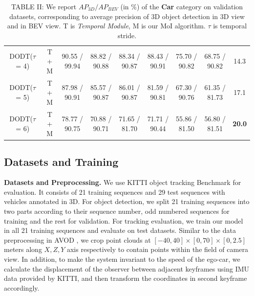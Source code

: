 \documentclass[letterpaper, 10pt, conference]{ieeeconf}  %
\begin{document}
\begin{table}
{\begin{tabular}{ccccccccc}
			\multicolumn{1}{c|}{DODT($\tau$ = 4)}     &\multicolumn{1}{c|}{T + M} & 90.55 / 99.94  & 88.82 / 90.88 & \multicolumn{1}{c|}{88.34 / 90.87}  & 88.43 / 90.91 & 75.70 / 90.82 & \multicolumn{1}{c|}{68.75 / 90.82}   & 14.3\\
			\multicolumn{1}{c|}{DODT($\tau$ = 5)}     &\multicolumn{1}{c|}{T + M} & 87.98 / 90.91  & 85.57 / 90.87 & \multicolumn{1}{c|}{86.01 / 90.87}  & 81.59 / 90.81 & 67.30 / 90.76 & \multicolumn{1}{c|}{61.35 / 81.73}   & 17.1\\
			\multicolumn{1}{c|}{DODT($\tau$ = 6)}     &\multicolumn{1}{c|}{T + M} & 78.77 / 90.75  & 70.88 / 90.71 & \multicolumn{1}{c|}{71.65 / 81.70}  & 71.71 / 90.44 & 55.86 / 81.50 & \multicolumn{1}{c|}{56.80 / 81.51}   & \textbf{20.0} \\ \midrule
	\end{tabular}}
	\setlength{\abovecaptionskip}{-1pt}
	\caption*{TABLE II: We report $AP_{3D}/AP_{BEV}$ (in \%) of the \textbf{Car} category on validation datasets, corresponding to average precision of 3D object detection in 3D view and in BEV view. T is \textit{Temporal Module}, M is our MoI algorithm. $\tau$ is temporal stride.} 
	\setlength{\belowcaptionskip}{1pt}
	\label{table:result_detection}
	\vspace{-0.65cm}
\end{table}

\subsection{Datasets and Training}

\textbf{Datasets and Preprocessing.} We use KITTI object tracking Benchmark \cite{geiger2013vision} for evaluation. It consists of 21 training sequences and 29 test sequences with vehicles annotated in 3D. For object detection, we split 21 training sequences into two parts according to their sequence number, odd numbered sequences for training and the rest for validation. For tracking evaluation, we train our model in all 21 training sequences and evaluate on test datasets. Similar to the data preprocessing in AVOD \cite{ku2018joint}, we crop point clouds at $[-40, 40] \times [0, 70] \times [0, 2.5]$ meters along $X, Z, Y$ axis respectively to contain points within the field of camera view. In addition, to make the system invariant to the speed of the ego-car, we calculate the displacement of the observer between adjacent keyframes using IMU data provided by KITTI, and then transform the coordinates in second keyframe accordingly. 
\end{document}
